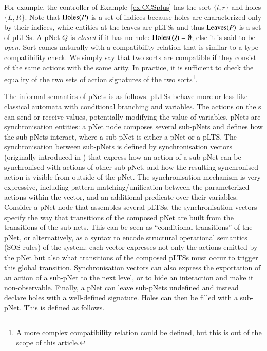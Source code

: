 \documentclass{elsarticle}
\newcommand{\TODO}[1]{\textcolor{red}{\textbf{[TODO:#1]}}}
\begin{document}
\begin{definition}
For example, the controller of Example~\ref{ex:CCSplus} has the sort $\{l,r\}$ and holes $\{L,R\}$.
Note that  $\operatorname{Holes}(P)$ is a set of indices because holes are characterized only by their indices, while entities at the leaves are pLTSs and thus $\operatorname{Leaves}(P)$ is a set of pLTSs.
A pNet $Q$ is \emph{closed} if it has no hole: $\operatorname{Holes}(Q)=\emptyset$; else it
is said to be \emph{open}.
Sort comes naturally with a compatibility relation that is similar to a type-compatibility check. We simply say that two sorts are compatible if they consist of the same actions with the same arity. In practice, it is sufficient to check the equality of the two sets of action signatures of the two sorts\footnote{A more complex compatibility relation could be defined, but this is out of the scope of this article.}.
\end{definition}
  
The informal semantics of pNets is as follows. pLTSs behave more or less like  classical automata with conditional branching and variables. The actions on the \pLTS s can send or receive values, potentially modifying the value of variables. 
pNets are synchronisation entities: a pNet node composes several sub-pNets and  defines how the sub-pNets interact, where a sub-pNet is either a pNet or a pLTS. The synchronisation between sub-pNets is defined by synchronisation vectors (originally introduced in \cite{Arnold1982}) that express how an action of a sub-pNet can be synchronised with actions of other sub-pNet, and how the resulting synchronised action is visible from outside of the pNet. The synchronisation mechanism is very expressive, including pattern-matching/unification between the parameterized actions within the vector, and an additional predicate over their variables.
Consider a pNet node that assembles several pLTSs, the synchronisation vectors specify the way that transitions of the composed pNet are built from the transitions of the sub-nets. This can be seen as ``conditional transitions'' of the pNet, or alternatively, as a syntax to encode structural operational semantics (SOS rules) \cite{plotkin:2004} of the system: each vector expresses not only the actions emitted by the pNet but also what transitions of the composed pLTSs must occur to trigger this global transition.
Synchronisation vectors can also express the exportation of an action of a sub-pNet to the next level, or to hide an interaction and make it non-observable. Finally, a pNet can leave sub-pNets undefined and instead declare holes with a well-defined signature. Holes can then be filled with a sub-pNet. This is defined as follows.
\end{document}

